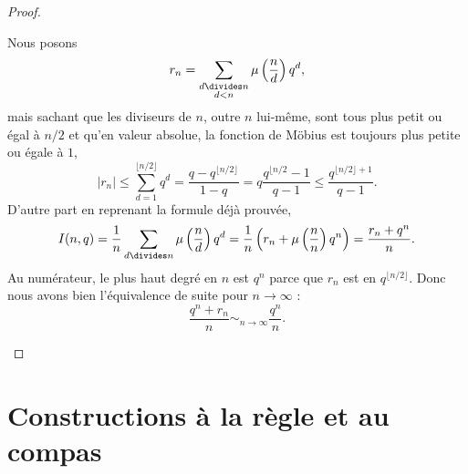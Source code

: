 \begin{proof}
\begin{enumerate}
            Nous posons 
            \begin{equation}
                r_n=\sum_{\substack{d\divides n\\d<n}}\mu\left( \frac{ n }{ d } \right)q^d,
            \end{equation}
            mais sachant que les diviseurs de \( n\), outre \( n\) lui-même, sont tous plus petit ou égal à \( n/2\) et qu'en valeur absolue, la fonction de Möbius est toujours plus petite ou égale à \( 1\),
            \begin{equation}
                | r_n |\leq\sum_{d=1}^{\lfloor n/2\rfloor}q^d=\frac{ q-q^{\lfloor n/2\rfloor} }{ 1-q }=q\frac{ q^{\lfloor n/2}-1 }{ q-1 }\leq \frac{ q^{\lfloor n/2 \rfloor+1} }{ q-1 }.
            \end{equation}
            D'autre part en reprenant la formule déjà prouvée,
            \begin{equation}
                I(n,q)=\frac{1}{ n }\sum_{d\divides n}\mu\left( \frac{ n }{ d } \right)q^d=\frac{1}{ n }\left( r_n+\mu\left( \frac{ n }{ n } \right)q^n \right)=\frac{ r_n+q^n }{ n }.
            \end{equation}
            Au numérateur, le plus haut degré en \( n\) est \( q^n\) parce que \( r_n\) est en \( q^{\lfloor n/2\rfloor}\). Donc nous avons bien l'équivalence de suite pour \( n\to \infty\) :
            \begin{equation}
                \frac{ q^n+r_n }{ n }\sim_{n\to\infty}\frac{ q^n }{ n }.
            \end{equation}
    \end{enumerate}
\end{proof}

\section{Constructions à la règle et au compas}

